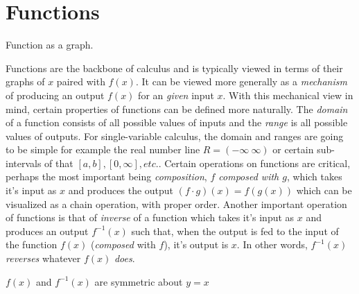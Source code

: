 \section{Functions}
\begin{marginfigure}[2\baselineskip]
  \caption{Function as a graph.}
\end{marginfigure}
Functions are the backbone of calculus and is typically viewed in terms of their graphs of $x$ paired with $f(x)$. It can be viewed more generally as a {\it mechanism} of producing an output $f(x)$ for an {\it given} input $x$. With this mechanical view in mind, certain properties of functions can be defined more naturally. The {\it domain} of a function consists of all possible values of inputs and the {\it range} is all possible values of outputs. For single-variable calculus, the domain and ranges are going to be simple for example the real number line $R=(-\infty ~\infty)$ or certain sub-intervals of that $[a,b], [0, \infty], etc.$. 
Certain operations on functions are critical, perhaps the most important being \textit{composition}, \textit{$f$ composed with $g$}, which takes it's input as $x$ and produces the output $(f\cdot g)(x)=f(g(x))$ which can be visualized as a chain operation, with proper order.
%
Another important operation of functions is that of \textit{inverse} of a function which takes it's input as $x$ and produces an output $f^{-1}(x)$ such that, when the output is fed to the input of the function $f(x)$ (\textit{composed} with $f$), it's output is $x$. In other words, $f^{-1}(x)$ \textit{reverses} whatever $f(x)$ \textit{does}.
\begin{marginfigure}[\baselineskip]
  \caption{$f(x)$ and $f^{-1}(x)$ are symmetric about $y=x$}
\end{marginfigure}
